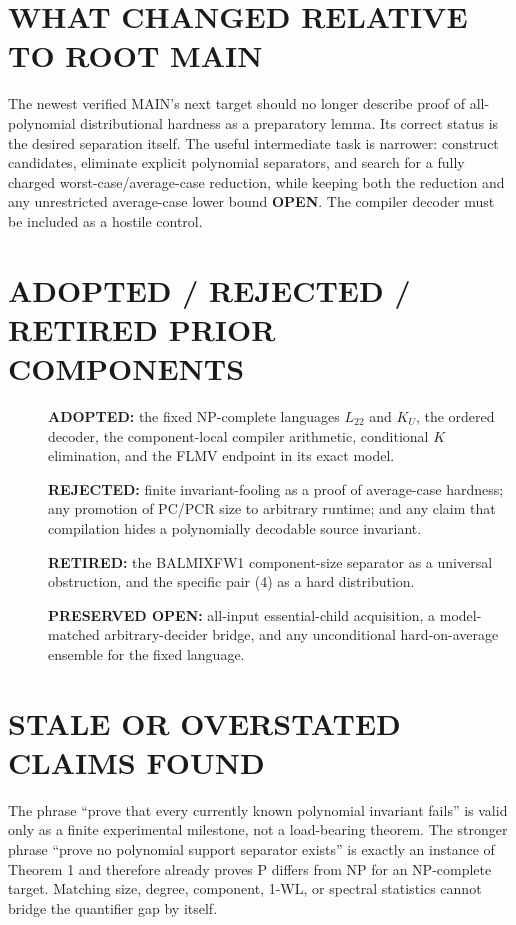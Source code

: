 \documentclass[11pt]{article}
\newcommand{\Ltwo}{L_{22}}
\newcommand{\KU}{K_U}
\newcommand{\OPEN}{\textbf{OPEN}}
\begin{document}
\section{WHAT CHANGED RELATIVE TO ROOT MAIN}
The newest verified MAIN's next target should no longer describe proof of
all-polynomial distributional hardness as a preparatory lemma.  Its correct
status is the desired separation itself.  The useful intermediate task is
narrower: construct candidates, eliminate explicit polynomial separators,
and search for a fully charged worst-case/average-case reduction, while
keeping both the reduction and any unrestricted average-case lower bound
\OPEN.  The compiler decoder must be included as a hostile control.

\section{ADOPTED / REJECTED / RETIRED PRIOR COMPONENTS}
\begin{description}
\item[] \textbf{ADOPTED:} the fixed NP-complete languages $\Ltwo$ and $\KU$,
the ordered decoder, the component-local compiler arithmetic, conditional
$K$ elimination, and the FLMV endpoint in its exact model.
\item[] \textbf{REJECTED:} finite invariant-fooling as a proof of average-case
hardness; any promotion of PC/PCR size to arbitrary runtime; and any claim
that compilation hides a polynomially decodable source invariant.
\item[] \textbf{RETIRED:} the BALMIXFW1 component-size separator as a universal
obstruction, and the specific pair (4) as a hard distribution.
\item[] \textbf{PRESERVED OPEN:} all-input essential-child acquisition, a
model-matched arbitrary-decider bridge, and any unconditional hard-on-average
ensemble for the fixed language.
\end{description}

\section{STALE OR OVERSTATED CLAIMS FOUND}
The phrase ``prove that every currently known polynomial invariant fails''
is valid only as a finite experimental milestone, not a load-bearing theorem.
The stronger phrase ``prove no polynomial support separator exists'' is
exactly an instance of Theorem 1 and therefore already proves P differs from
NP for an NP-complete target.  Matching size, degree, component, 1-WL, or
spectral statistics cannot bridge the quantifier gap by itself.
\end{document}
